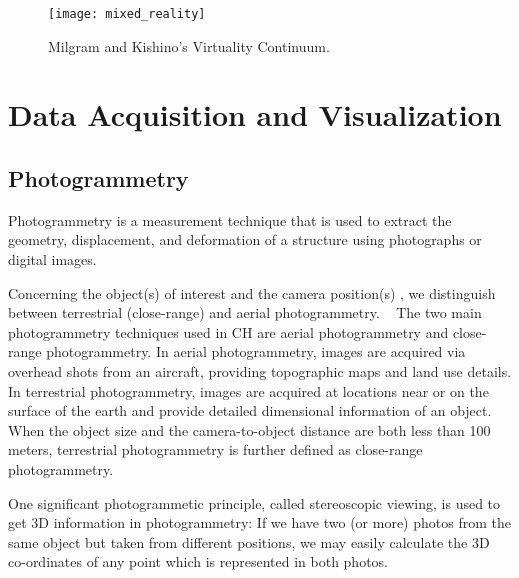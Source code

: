 \begin{figure}[htbp]
    \centering
    \texttt{[image: mixed\_reality]}
    \caption{Milgram and Kishino’s Virtuality Continuum. ~\cite{milgram1994taxonomy}}
    \label{fig:mixed_reality} 
\end{figure} 
\FloatBarrier


\section{ Data Acquisition and Visualization}
\label{sec:data}

\subsection{Photogrammetry}
\label{sec:photogrammetry}

Photogrammetry is a measurement technique that is used to extract the geometry, displacement, and deformation of a
structure using photographs or digital images. ~\cite{Baqersad2017Photogrammetry}

Concerning the object(s) of interest and the camera position(s) , we distinguish
between terrestrial (close-range) and aerial photogrammetry.  ~\cite{linder2016digital}
The two main photogrammetry techniques used in \gls{CH} are aerial photogrammetry and close-range photogrammetry.
In aerial photogrammetry, images are acquired via overhead shots from an aircraft, providing topographic maps and land use details. In terrestrial photogrammetry, images are acquired at locations near or on the surface of
the earth and provide detailed dimensional information of an object. When the object size and the camera-to-object 
distance are both less than 100 meters, terrestrial photogrammetry is further defined as close-range photogrammetry.


One significant photogrammetic principle, called stereoscopic viewing, is used to get
\gls{3D} information in photogrammetry: If we have two (or more) photos
from the same object but taken from different positions, we may easily calculate the
\gls{3D} co-ordinates of any point which is represented in both photos.~\cite{linder2016digital}



